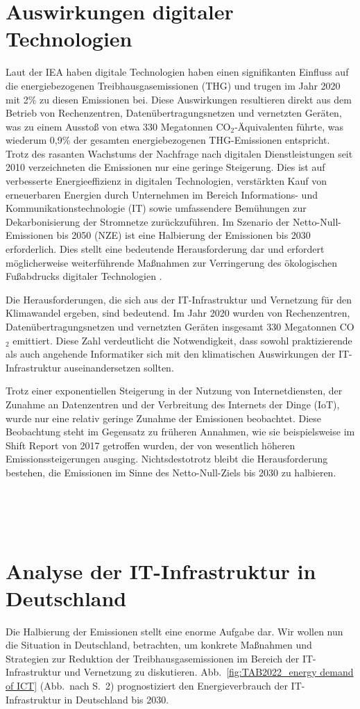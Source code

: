 \documentclass{article}
\newcommand{\comJP}[1]{
		~\\~
		\fcolorbox{red}{white}{\parbox{\linewidth}{ #1}}
		~\\~
}
\begin{document}
\section{Auswirkungen digitaler Technologien}
Laut der IEA haben digitale Technologien haben einen signifikanten Einfluss auf die energiebezogenen Treibhausgasemissionen (THG) und trugen im Jahr 2020 mit 2\% zu diesen Emissionen bei. Diese Auswirkungen resultieren direkt aus dem Betrieb von Rechenzentren, Datenübertragungsnetzen und vernetzten Geräten, was zu einem Ausstoß von etwa 330 Megatonnen CO$_2$-Äquivalenten führte, was wiederum 0,9\% der gesamten energiebezogenen THG-Emissionen entspricht.
Trotz des rasanten Wachstums der Nachfrage nach digitalen Dienstleistungen seit 2010 verzeichneten die Emissionen nur eine geringe Steigerung. Dies ist auf verbesserte Energieeffizienz in digitalen Technologien, verstärkten Kauf von erneuerbaren Energien durch Unternehmen im Bereich Informations- und Kommunikationstechnologie (IT) sowie umfassendere Bemühungen zur Dekarbonisierung der Stromnetze zurückzuführen.
Im Szenario der Netto-Null-Emissionen bis 2050 (NZE) ist eine Halbierung der Emissionen bis 2030 erforderlich. Dies stellt eine bedeutende Herausforderung dar und erfordert möglicherweise weiterführende Maßnahmen zur Verringerung des ökologischen Fußabdrucks digitaler Technologien \cite{iea_digitalisation}.

Die Herausforderungen, die sich aus der IT-Infrastruktur und Vernetzung für den Klimawandel ergeben, sind bedeutend. Im Jahr 2020 wurden von Rechenzentren, Datenübertragungsnetzen und vernetzten Geräten insgesamt 330 Megatonnen CO$_2$ emittiert. Diese Zahl verdeutlicht die Notwendigkeit, dass sowohl praktizierende als auch angehende Informatiker sich mit den klimatischen Auswirkungen der IT-Infrastruktur auseinandersetzen sollten.

Trotz einer exponentiellen Steigerung in der Nutzung von Internetdiensten, der Zunahme an Datenzentren und der Verbreitung des Internets der Dinge (IoT), wurde nur eine relativ geringe Zunahme der Emissionen beobachtet. Diese Beobachtung steht im Gegensatz zu früheren Annahmen, wie sie beispielsweise im Shift Report von 2017 getroffen wurden, der von wesentlich höheren Emissionssteigerungen ausging. Nichtsdestotrotz bleibt die Herausforderung bestehen, die Emissionen im Sinne des Netto-Null-Ziels bis 2030 zu halbieren.

\comJP{hier fehlen noch Quellen \cite{????}}


\section{Analyse der IT-Infrastruktur in Deutschland}
Die Halbierung der Emissionen stellt eine enorme Aufgabe dar. Wir wollen nun die Situation in Deutschland, betrachten, um konkrete Maßnahmen und Strategien zur Reduktion der Treibhausgasemissionen im Bereich der IT-Infrastruktur und Vernetzung zu diskutieren.
Abb.~\ref{fig:TAB2022_energy demand of ICT} (Abb.~nach \cite{grunwald_energy_2022} S.~2) prognostiziert den Energieverbrauch der IT-Infrastruktur in Deutschland bis 2030.
\end{document}

